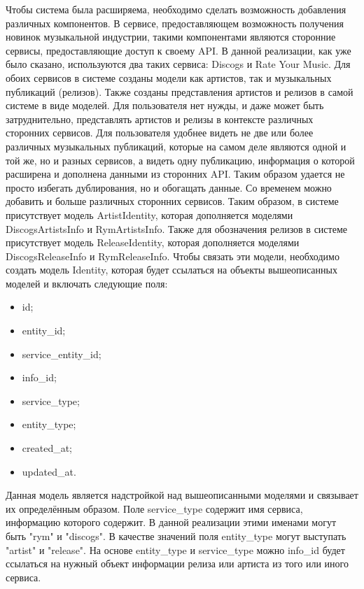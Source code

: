 Чтобы система была расширяема, необходимо сделать возможность добавления различных компонентов. В сервисе, предоставляющем возможность получения новинок музыкальной индустрии, такими компонентами являются сторонние сервисы, предоставляющие доступ к своему API. В данной реализации, как уже было сказано, используются два таких сервиса: Discogs и Rate Your Music. Для обоих сервисов в системе созданы модели как артистов, так и музыкальных публикаций (релизов). Также созданы представления артистов и релизов в самой системе в виде моделей. Для пользователя нет нужды, и даже может быть затруднительно, представлять артистов и релизы в контексте различных сторонних сервисов. Для пользователя удобнее видеть не две или более различных музыкальных публикаций, которые на самом деле являются одной и той же, но и разных сервисов, а видеть одну публикацию, информация о которой расширена и дополнена данными из сторонних API. Таким образом удается не просто избегать дублирования, но и обогащать данные. Со временем можно добавить и больше различных сторонних сервисов. Таким образом, в системе присутствует модель ArtistIdentity, которая дополняется моделями DiscogsArtistsInfo и RymArtistsInfo. Также для обозначения релизов в системе присутствует модель ReleaseIdentity, которая дополняется моделями DiscogsReleaseInfo и RymReleaseInfo. Чтобы связать эти модели, необходимо создать модель Identity, которая будет ссылаться на объекты вышеописанных моделей и включать следующие поля:

\begin{itemize}
  \item id;
  \item entity\_id;
  \item service\_entity\_id;
  \item info\_id;
  \item service\_type;
  \item entity\_type;
  \item created\_at;
  \item updated\_at.
\end{itemize}

Данная модель является надстройкой над вышеописанными моделями и связывает их определённым образом. Поле service\_type содержит имя сервиса, информацию которого содержит. В данной реализации этими именами могут быть "rym" и "discogs". В качестве значений поля entity\_type могут выступать "artist" и "release". На основе entity\_type и service\_type можно info\_id будет ссылаться на нужный объект информации релиза или артиста из того или иного сервиса.

